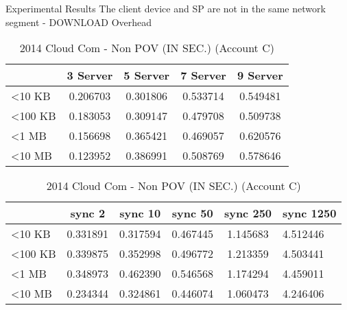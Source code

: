 \begin{frame}{Experimental Results}
{The client device and SP are \alert{not} in the same network segment - DOWNLOAD Overhead}
	\scriptsize
    \begin{table}[]
    \centering
    \caption{My Method - Non POV (IN SEC.) (Account C)}
    \begin{tabular}{lcccc}
                         & 3 Server & 5 Server & 7 Server & 9 Server \\ \hline
        \textless 10 KB  & 0.206703 & 0.301806 & 0.533714 & 0.549481 \\ \hline
        \textless 100 KB & 0.183053 & 0.309147 & 0.479708 & 0.509738 \\ \hline
        \textless 1 MB   & 0.156698 & 0.365421 & 0.469057 & 0.620576 \\ \hline
        \textless 10 MB  & 0.123952 & 0.386991 & 0.508769 & 0.578646 \\ \hline
    \end{tabular}
    \caption{2014 Cloud Com - Non POV (IN SEC.) (Account C)}
    \begin{tabular}{lccccl}
                         & sync 2   & sync 10  & sync 50  & sync 250 & sync 1250 \\ \hline
        \textless 10 KB  & 0.331891 & 0.317594 & 0.467445 & 1.145683 & 4.512446  \\ \hline
        \textless 100 KB & 0.339875 & 0.352998 & 0.496772 & 1.213359 & 4.503441  \\ \hline
        \textless 1 MB   & 0.348973 & 0.462390 & 0.546568 & 1.174294 & 4.459011  \\ \hline
        \textless 10 MB  & 0.234344 & 0.324861 & 0.446074 & 1.060473 & 4.246406  \\ \hline
    \end{tabular}
    \end{table}
\end{frame}

